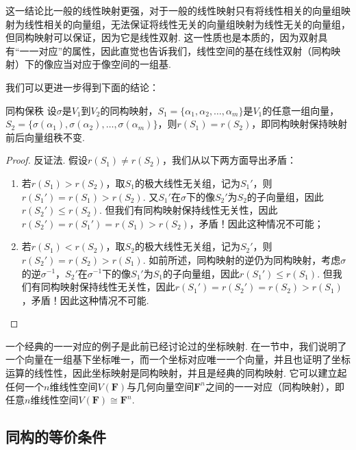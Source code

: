 \begin{enumerate}
          这一结论比一般的线性映射更强，对于一般的线性映射只有将线性相关的向量组映射为线性相关的向量组，无法保证将线性无关的向量组映射为线性无关的向量组，但同构映射可以保证，因为它是线性双射. 这一性质也是本质的，因为双射具有``一一对应''的属性，因此直觉也告诉我们，线性空间的基在线性双射（同构映射）下的像应当对应于像空间的一组基.

          我们可以更进一步得到下面的结论：
          \begin{theorem}{}{同构保秩}
              设$\sigma$是$V_1$到$V_2$的同构映射，$S_1=\{\alpha_1,\alpha_2,\ldots,\alpha_m\}$是$V_1$的任意一组向量，$S_2=\{\sigma(\alpha_1),\sigma(\alpha_2),\ldots,\sigma(\alpha_m)\}$，则$r(S_1)=r(S_2)$，即同构映射保持映射前后向量组秩不变.
          \end{theorem}
          \begin{proof}
              反证法. 假设$r(S_1)\neq r(S_2)$，我们从以下两方面导出矛盾：
              \begin{enumerate}
                  \item 若$r(S_1)>r(S_2)$，取$S_1$的极大线性无关组，记为$S_1'$，则$r(S_1')=r(S_1)>r(S_2)$. 又$S_1'$在$\sigma$下的像$S_2'$为$S_2$的子向量组，因此$r(S_2')\leqslant r(S_2)$. 但我们有同构映射保持线性无关性，因此$r(S_2')=r(S_1')=r(S_1)>r(S_2)$，矛盾！因此这种情况不可能；

                  \item 若$r(S_1)<r(S_2)$，取$S_2$的极大线性无关组，记为$S_2'$，则$r(S_2')=r(S_2)>r(S_1)$. 如前所述，同构映射的逆仍为同构映射，考虑$\sigma$的逆$\sigma^{-1}$，$S_2'$在$\sigma^{-1}$下的像$S_1'$为$S_1$的子向量组，因此$r(S_1')\leqslant r(S_1)$. 但我们有同构映射保持线性无关性，因此$r(S_1')=r(S_2')=r(S_2)>r(S_1)$，矛盾！因此这种情况不可能.
              \end{enumerate}
          \end{proof}
\end{enumerate}

一个经典的一一对应的例子是此前已经讨论过的坐标映射. 在一节中，我们说明了一个向量在一组基下坐标唯一，而一个坐标对应唯一一个向量，并且也证明了坐标运算的线性性，因此坐标映射是同构映射，并且是经典的同构映射. 它可以建立起任何一个$n$维线性空间$V(\mathbf{F})$与几何向量空间$\mathbf{F}^n$之间的一一对应（同构映射），即任意$n$维线性空间$V(\mathbf{F})\cong\mathbf{F}^n$.

\subsection{同构的等价条件}

